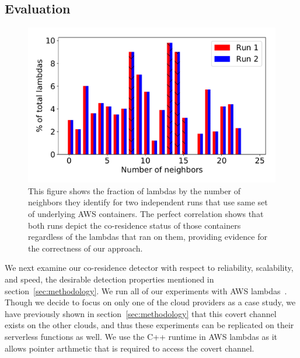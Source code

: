 \subsection{Evaluation}
\label{sec:eval}

\begin{figure}[!t]
  \includegraphics[width=.99\linewidth]{fig/correlation.pdf}
  \caption{This figure shows the fraction of lambdas by the number of neighbors 
  they identify for two independent runs that use same set of underlying AWS
  containers. The perfect correlation shows that both runs depict the co-residence 
  status of those containers regardless of the lambdas that ran on them, providing
  evidence for the correctness of our approach.
\label{fig:correlation}}
\end{figure}


We next examine our co-residence detector with respect to reliability,
scalability, and speed, the desirable detection properties mentioned in
section~\ref{sec:methodology}.  We run all of our experiments with AWS
lambdas~\cite{awscloud}. Though we decide to focus on only one of the cloud
providers as a case study, we have previously shown in
section~\ref{sec:methodology} that this covert channel exists on the other
clouds, and thus these experiments can be replicated on their serverless
functions as well. We use the C++ runtime in AWS lambdas as it allows pointer
arthmetic that is required to access the covert channel.

